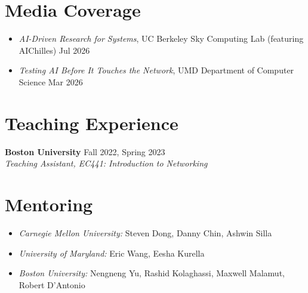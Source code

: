 \documentclass[11pt,letterpaper]{article}
\newcommand{\entry}[4]{%
  \textbf{#1} \hfill #2 \\
  \textit{#3}%
  \if\relax\detokenize{#4}\relax\else \\ #4\fi
  \par\vspace{0.55em}%
}
\newcommand{\dateditem}[2]{\item #1 \hfill #2}
\begin{document}

\section{Media Coverage}

\begin{itemize}[label={},leftmargin=0pt]
  \dateditem{\textit{AI-Driven Research for Systems}, UC Berkeley Sky Computing Lab (featuring AIChilles)}{Jul 2026}
  \dateditem{\textit{Testing AI Before It Touches the Network}, UMD Department of Computer Science }{Mar 2026}
\end{itemize}


\section{Teaching Experience}

\entry{Boston University}{Fall 2022, Spring 2023}
  {Teaching Assistant, EC441: Introduction to Networking}
  {}


\section{Mentoring}

\begin{itemize}[label={},leftmargin=0pt]
  \item \textit{Carnegie Mellon University:} Steven Dong, Danny Chin, Ashwin Silla
  \item \textit{University of Maryland:} Eric Wang, Eesha Kurella
  \item \textit{Boston University:} Nengneng Yu, Rashid Kolaghassi, Maxwell Malamut, Robert D'Antonio
\end{itemize}

\end{document}
